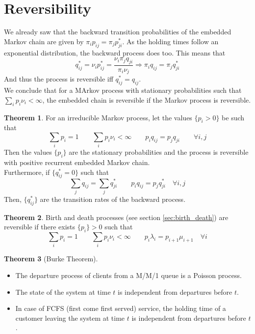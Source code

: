 \documentclass[12pt, openany]{report}
\theoremstyle{definition}
\newtheorem{thm}{Theorem}[chapter]
\begin{document}
\section{Reversibility}
We already saw that the backward transition probabilities of the embedded Markov chain are given by $\pi_i p_{ij} = \pi_j p_{ji}^*$. As the holding times follow an exponential distribution, the backward process does too. This means that 
\begin{equation}
	q_{ij}^* = \nu_i p_{ij}^* = \frac{\nu_i \pi_j q_{ji}}{\pi_i\nu_j} \Longrightarrow \pi_i q_{ij} = \pi_j q_{ji}^* 
\end{equation}
And thus the process is reversible iff $q_{ij}^*=q_{ij}$.\\
We conclude that for a MArkov process with stationary probabilities such that $\sum_i p_i\nu_i<\infty$, the embedded chain is reversible if the Markov process is reversible.
\begin{thm}
	For an irreducible Markov process, let the values $\{p_i>0\}$ be such that 
	\begin{equation}
		\sum_i p_i = 1\qquad \sum_i p_i\nu_i <\infty \qquad p_iq_{ij} = p_j q_{ji} \qquad \forall i,j
	\end{equation}
	Then the values $\{p_i\}$ are the stationary probabilities and the process is reversible with positive recurrent embedded Markov chain.\\
	Furthermore, if $\{q_{ij}^*=0\}$ such that
	\begin{equation}
		\sum_j q_{ij} = \sum_j q_{ji}^* \qquad p_i q_{ij} = p_j q_{ji}^* \quad \forall i,j
	\end{equation}
	Then, $\{q_{ij}^*\}$ are the transition rates of the backward process.
\end{thm}
\begin{thm}
	Birth and death processes (see section \ref{sec:birth_death}) are reversible if there exists $\{p_i\}>0$ such that 
	\begin{equation}
		\sum_i p_i = 1\qquad \sum_i p_i\nu_i <\infty \qquad p_i\lambda_i = p_{i+1}\mu_{i+1} \quad \forall i
	\end{equation}
\end{thm}
\begin{thm}[Burke Theorem]
	\begin{itemize}
		\item The departure process of clients from a M/M/1 queue is a Poisson process.
		\item The state of the system at time $t$ is independent from departures before $t$.
		\item In case of FCFS (first come first served) service, the holding time of a customer leaving the system at time $t$ is independent from departures before $t$.
	\end{itemize}
\end{thm}
\end{document}
